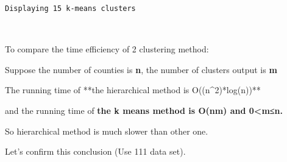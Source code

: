 \documentclass[11pt]{article}
\begin{document}
    \begin{Verbatim}[commandchars=\\\{\}]
Displaying 15 k-means clusters

    \end{Verbatim}

    \begin{center}
    \end{center}
    { \hspace*{\fill} \\}
    
    To compare the time efficiency of 2 clustering method:

Suppose the number of counties is \textbf{n}, the number of clusters
output is \textbf{m}

The running time of **the hierarchical method is O((n\^{}2)*log(n))**

and the running time of \textbf{the k means method is O(nm) and
0\textless{}m≤n.}

So hierarchical method is much slower than other one.

Let's confirm this conclusion (Use 111 data set).
\end{document}
